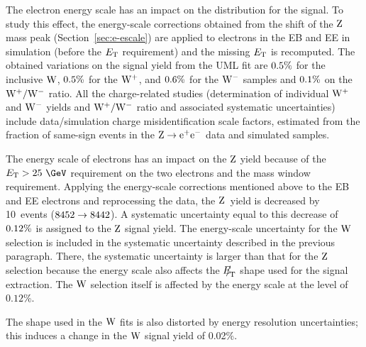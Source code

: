 \par
The electron energy scale has an impact on the \ET distribution
for the signal. To study this effect, the
energy-scale corrections obtained
from the shift of the $\mathrm{Z}$ mass peak
(Section~\ref{sec:e-escale}) are applied to electrons in the EB and EE
in simulation (before the $E\,\,_{\!\!\!\mathrm{T}}$ requirement)
and  the missing $E\,\,_{\!\!\!\mathrm{T}}$ is recomputed.
The obtained variations on the signal yield from the UML fit
are $ 0.5  \%$ for the inclusive $\mathrm{W}$, $ 0.5  \%$ for the $\mathrm{W^+}$, and
$ 0.6  \%$ for the $\mathrm{W^-}$ samples and $ 0.1  \%$ on the
$\mathrm{W^+}/\mathrm{W^-}$ ratio.  All the charge-related studies (determination of individual $\mathrm{W^+}$ and $\mathrm{W^-}$
yields and $\mathrm{W^+}/\mathrm{W^-}$ ratio and associated systematic uncertainties)
include data/simulation
charge misidentification scale factors, estimated from
the fraction of same-sign events in the $\mathrm{Z} \rightarrow \mathrm{e}^+\mathrm{e}^-$ data and simulated samples.
\par
The energy scale of electrons has an impact on the $\mathrm{Z}$ yield because of 
the $\Et>25~\GeV$ requirement on the two electrons and the mass window requirement.
Applying the energy-scale corrections
mentioned above to the EB and EE electrons and reprocessing the data, 
the $\mathrm{Z}$~yield is decreased by 10~events ($8452  \to 8442 $).
A systematic uncertainty equal to this decrease of $ 0.12  \%$
is assigned to the $\mathrm{Z}$ signal yield.
The energy-scale uncertainty for the $\mathrm{W}$ selection is included in the systematic uncertainty 
described in the previous paragraph. There, the systematic uncertainty 
is larger than that for the $\mathrm{Z}$ selection because the energy scale also affects the 
${E\!\!\!/}_{\!\mathrm{T}}$ shape used for the signal extraction.
The $\mathrm{W}$ selection itself is affected by the energy scale at the level of $0.12\%$.
\par
The \MET shape used in the $\mathrm{W}$ fits is also distorted
by energy resolution uncertainties; this induces a change in the $\mathrm{W}$ signal yield
of 0.02\%.

\par



